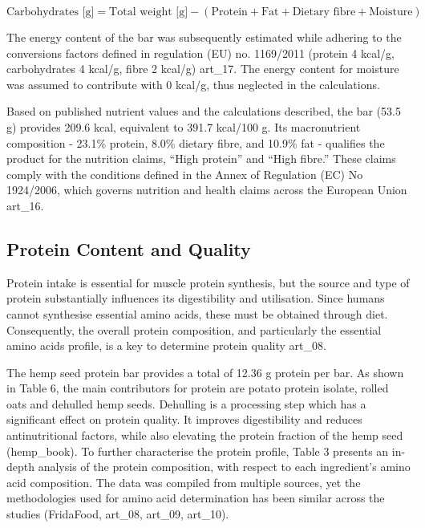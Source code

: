 \begin{equation}
    \text{Carbohydrates [g]} = 
    \text{Total weight [g]} - (\text{Protein} + \text{Fat} + \text{Dietary fibre} + \text{Moisture})
    \label{eq:carbohydrates}
\end{equation}

The energy content of the bar was subsequently estimated while adhering to the conversions factors defined in regulation (EU) no. 1169/2011 (protein 4 kcal/g, carbohydrates 4 kcal/g, fibre 2 kcal/g) art\_17. The energy content for moisture was assumed to contribute with 0 kcal/g, thus neglected in the calculations. 

\vspace{1em}
Based on published nutrient values and the calculations described, the bar (53.5 g) provides 209.6 kcal, equivalent to 391.7 kcal/100 g. Its macronutrient composition - 23.1\% protein, 8.0\% dietary fibre, and 10.9\% fat - qualifies the product for the nutrition claims, “High protein” and “High fibre.” These claims comply with the conditions defined in the Annex of Regulation (EC) No 1924/2006, which governs nutrition and health claims across the European Union art\_16.    

\subsection{Protein Content and Quality}
Protein intake is essential for muscle protein synthesis, but the source and type of protein substantially influences its digestibility and utilisation. Since humans cannot synthesise essential amino acids, these must be obtained through diet. Consequently, the overall protein composition, and particularly the essential amino acids profile, is a key to determine protein quality art\_08.

\vspace{1em}
The hemp seed protein bar provides a total of 12.36 g protein per bar. As shown in Table 6, the main contributors for protein are potato protein isolate, rolled oats and dehulled hemp seeds. Dehulling is a processing step which has a significant effect on protein quality. It improves digestibility and reduces antinutritional factors, while also elevating the protein fraction of the hemp seed (hemp\_book). To further characterise the protein profile, Table 3 presents an in-depth analysis of the protein composition, with respect to each ingredient’s amino acid composition. The data was compiled from multiple sources, yet the methodologies used for amino acid determination has been similar across the studies (FridaFood, art\_08, art\_09, art\_10).

